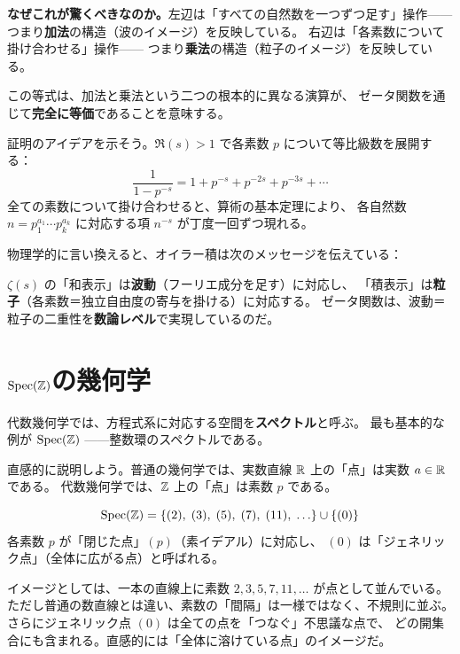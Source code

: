 \noindent\textbf{なぜこれが驚くべきなのか。}左辺は「すべての自然数を一つずつ足す」操作——
つまり\textbf{加法}の構造（波のイメージ）を反映している。
右辺は「各素数について掛け合わせる」操作——
つまり\textbf{乗法}の構造（粒子のイメージ）を反映している。

この等式は、加法と乗法という二つの根本的に異なる演算が、
ゼータ関数を通じて\textbf{完全に等価}であることを意味する。

\begin{hsbox}
証明のアイデアを示そう。$\Re(s)>1$ で各素数 $p$ について等比級数を展開する：
\[
  \frac{1}{1-p^{-s}} = 1 + p^{-s} + p^{-2s} + p^{-3s} + \cdots
\]
全ての素数について掛け合わせると、算術の基本定理により、
各自然数 $n = p_1^{a_1}\cdots p_k^{a_k}$ に対応する項 $n^{-s}$ が丁度一回ずつ現れる。
\end{hsbox}

物理学的に言い換えると、オイラー積は次のメッセージを伝えている：

\begin{hypbox}[物理的直観]
$\zeta(s)$ の「和表示」は\textbf{波動}（フーリエ成分を足す）に対応し、
「積表示」は\textbf{粒子}（各素数＝独立自由度の寄与を掛ける）に対応する。
ゼータ関数は、波動＝粒子の二重性を\textbf{数論レベル}で実現しているのだ。
\end{hypbox}

\section{$\Spec(\Z)$の幾何学}
\label{sec:1.3}

代数幾何学では、方程式系に対応する空間を\textbf{スペクトル}と呼ぶ。
最も基本的な例が $\Spec(\Z)$ ——整数環のスペクトルである。

直感的に説明しよう。普通の幾何学では、実数直線 $\mathbb{R}$ 上の「点」は実数 $a\in\mathbb{R}$ である。
代数幾何学では、$\mathbb{Z}$ 上の「点」は素数 $p$ である。

\begin{dfnbox}[定義: $\Spec(\Z)$]
\[
  \operatorname{Spec}(\mathbb{Z}) = \{(2),\; (3),\; (5),\; (7),\; (11),\; \ldots\} \cup \{(0)\}
\]
各素数 $p$ が「閉じた点」$(p)$（素イデアル）に対応し、
$(0)$ は「ジェネリック点」（全体に広がる点）と呼ばれる。
\end{dfnbox}

\begin{hsbox}
イメージとしては、一本の直線上に素数 $2, 3, 5, 7, 11, \ldots$ が点として並んでいる。
ただし普通の数直線とは違い、素数の「間隔」は一様ではなく、不規則に並ぶ。
さらにジェネリック点 $(0)$ は全ての点を「つなぐ」不思議な点で、
どの開集合にも含まれる。直感的には「全体に溶けている点」のイメージだ。
\end{hsbox}

